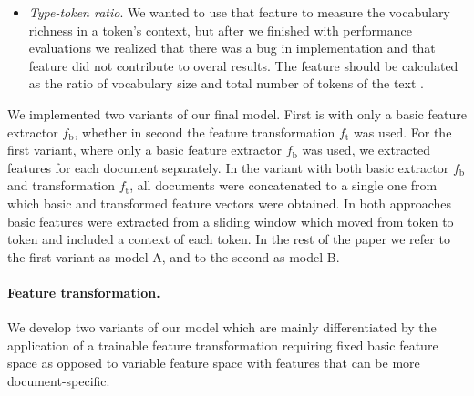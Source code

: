 \documentclass[10pt, a4paper]{article}
\begin{document}
\begin{itemize}
	\item \textit{Type-token ratio}. We wanted to use that feature to measure the vocabulary richness in a token's context, but after we finished with performance evaluations we realized that there was a bug in implementation and that feature did not contribute to overal results. The feature should be calculated as the ratio of vocabulary size and total number of tokens of the text \citep{stamatatos-2009a}.
\end{itemize}

We implemented two variants of our final model. First is with only a basic feature extractor $f_\mathrm{b}$, whether in second the feature transformation $f_\mathrm{t}$ was used. For the first variant, where only a basic feature extractor $f_\mathrm{b}$ was used, we extracted features for each document separately. In the variant with both basic extractor $f_\mathrm{b}$ and transformation $f_\mathrm{t}$, all documents were concatenated to a single one from which basic and transformed feature vectors were obtained. In both approaches basic features were extracted from a sliding window which moved from token to token and included a context of each token. In the rest of the paper we refer to the first variant as model A, and to the second as model B.

\paragraph{Feature transformation.} We develop two variants of our model which are mainly differentiated by the application of a trainable feature transformation requiring fixed basic feature space as opposed to variable feature space with features that can be more document-specific.
\end{document}
